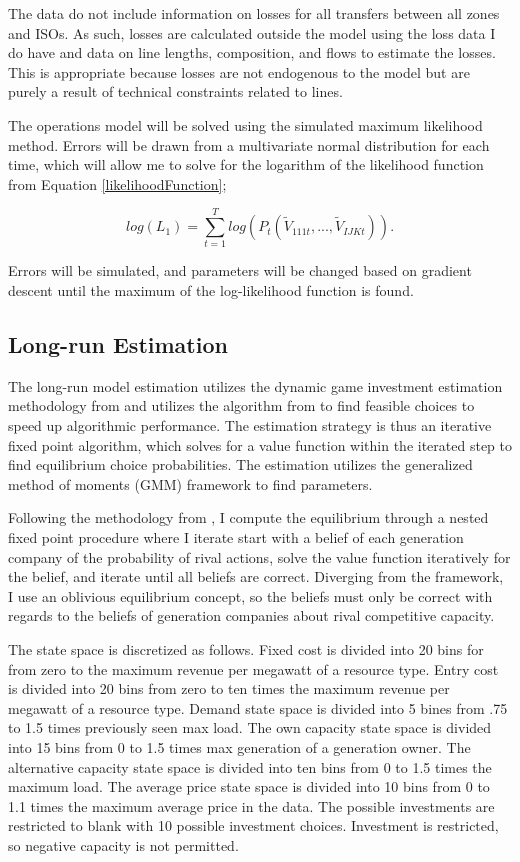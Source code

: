 \documentclass[12pt]{article}
\begin{document}
The data do not include information on losses for all transfers between all zones and ISOs. As such, losses are calculated outside the model using the loss data I do have and data on line lengths, composition, and flows to estimate the losses. This is appropriate because losses are not endogenous to the model but are purely a result of technical constraints related to lines.

The operations model will be solved using the simulated maximum likelihood method. Errors will be drawn from a multivariate normal distribution for each time, which will allow me to solve for the logarithm of the likelihood function from Equation \ref{likelihoodFunction};

\begin{equation}
log(L_1)= \sum_{t=1}^T log(P_t(\tilde{V}_{111t},...,\tilde{V}_{IJKt})).
\end{equation}

Errors will be simulated, and parameters will be changed based on gradient descent until the maximum of the log-likelihood function is found.

\subsection{Long-run Estimation}

The long-run model estimation utilizes the dynamic game investment estimation methodology from \cite{pakes1998empirical} and utilizes the algorithm from \cite{gowrisankaran2024computable} to find feasible choices to speed up algorithmic performance. The estimation strategy is thus an iterative fixed point algorithm, which solves for a value function within the iterated step to find equilibrium choice probabilities. The estimation utilizes the generalized method of moments (GMM) framework to find parameters. 

Following the methodology from \cite{gowrisankaran2024computable}, I compute the equilibrium through a nested fixed point procedure where I iterate start with a belief of each generation company of the probability of rival actions, solve the value function iteratively for the belief, and iterate until all beliefs are correct. Diverging from the framework, I use an oblivious equilibrium concept, so the beliefs must only be correct with regards to the beliefs of generation companies about rival competitive capacity.

The state space is discretized as follows. Fixed cost is divided into 20 bins for from zero to the maximum revenue per megawatt of a resource type. Entry cost is divided into 20 bins from zero to ten times the maximum revenue per megawatt of a resource type. Demand state space is divided into 5 bines from .75 to 1.5 times previously seen max load. The own capacity state space is divided into 15 bins from 0 to 1.5 times max generation of a generation owner. The alternative capacity state space is divided into ten bins from 0 to 1.5 times the maximum load. The average price state space is divided into 10 bins from 0 to 1.1 times the maximum average price in the data. 
The possible investments are restricted to blank with 10 possible investment choices. Investment is restricted, so negative capacity is not permitted.
\end{document}
